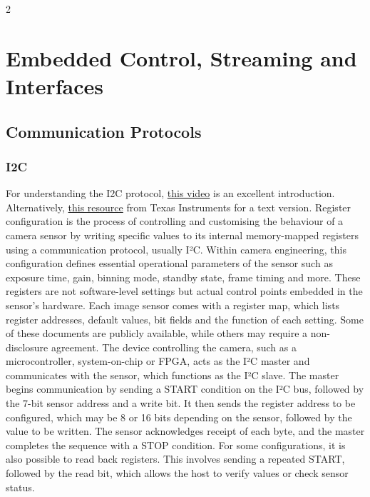 \documentclass[10pt]{article}
\begin{document}
\begin{multicols}{2}

\section{Embedded Control, Streaming and Interfaces}

\subsection{Communication Protocols}
\subsubsection{I2C}
For understanding the I2C protocol, \href{https://www.youtube.com/watch?v=CAvawEcxoPU&t=419s}{this video} is an excellent introduction.
Alternatively, \href{https://www.ti.com/lit/an/slva704/slva704.pdf?ts=1752540634031&ref_url=https%253A%252F%252Fwww.google.com%252F}{this resource} from Texas Instruments for a text version.
\newline \newline
Register configuration is the process of controlling and customising the behaviour of a camera sensor by writing specific values to its internal memory-mapped registers using a communication protocol, usually I²C.
Within camera engineering, this configuration defines essential operational parameters of the sensor such as exposure time, gain, binning mode, standby state, frame timing and more.
These registers are not software-level settings but actual control points embedded in the sensor's hardware. Each image sensor comes with a register map, which lists register addresses, default values, bit fields and the function of each setting. Some of these documents are publicly available, while others may require a non-disclosure agreement.
\newline \newline
The device controlling the camera, such as a microcontroller, system-on-chip or FPGA, acts as the I²C master and communicates with the sensor, which functions as the I²C slave. 
The master begins communication by sending a START condition on the I²C bus, followed by the 7-bit sensor address and a write bit. It then sends the register address to be configured, which may be 8 or 16 bits depending on the sensor, followed by the value to be written.
The sensor acknowledges receipt of each byte, and the master completes the sequence with a STOP condition. For some configurations, it is also possible to read back registers. This involves sending a repeated START, followed by the read bit, which allows the host to verify values or check sensor status.

\end{multicols}
\end{document}
